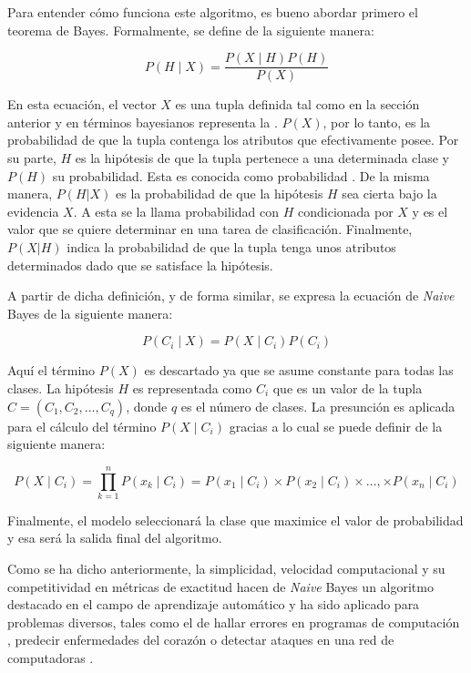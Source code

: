 Para entender cómo funciona este algoritmo, es bueno abordar primero  el teorema
de Bayes. Formalmente, se define de la siguiente manera:

\begin{equation}
   P(H \mid X) = \frac{P(X \mid H) P(H)}{P(X)}
\end{equation}

En esta ecuación, el vector $X$ es una tupla definida tal como en la sección
anterior y en términos bayesianos representa la . $P(X)$,
por lo tanto, es la probabilidad de que la tupla contenga los atributos que
efectivamente posee. Por su parte, $H$ es la hipótesis de que la tupla pertenece
a una determinada clase y $P(H)$ su probabilidad. Esta es conocida como
probabilidad . De la misma manera, $P(H|X)$ es la
probabilidad de que la hipótesis $H$ sea cierta bajo la evidencia $X$. A esta se
la llama probabilidad  con $H$ condicionada por $X$ y es
el valor que se quiere determinar en una tarea de clasificación.  Finalmente,
$P(X|H)$ indica la probabilidad de que la tupla tenga unos atributos
determinados dado que se satisface la hipótesis.

A partir de dicha definición, y de forma similar, se expresa la ecuación de
\textit{Naive} Bayes de la siguiente manera:

\begin{equation} 
   P(C_{i} \mid X) = P(X \mid C_{i}) P(C_{i})
\end{equation}

Aquí el término $P(X)$ es descartado ya que se asume constante para todas las
clases. La hipótesis $H$ es representada como $C_{i}$ que es un valor de la
tupla $C=(C_{1},C_{2},\dots,C_{q})$, donde $q$ es el número de clases. La
presunción  es aplicada para el cálculo del término $P(X \mid
C_{i})$ gracias a lo cual se puede definir de la siguiente manera:

\begin{equation} 
   P(X \mid C_{i}) = \prod\limits_{k=1}^n{P(x_{k} \mid C_{i})} =
   P(x_{1} \mid C_{i}) \times 
   P(x_{2} \mid C_{i}) \times \dots, \times 
   P(x_{n} \mid C_{i})   
\end{equation}

Finalmente, el modelo seleccionará la clase que maximice el valor de
probabilidad y esa será la salida final del algoritmo.  

Como se ha dicho anteriormente, la simplicidad, velocidad computacional y su
competitividad en métricas de exactitud hacen de \textit{Naive} Bayes un
algoritmo destacado en el campo de aprendizaje automático
\cite{wickramasinghe_naive_2020} y ha sido aplicado para problemas diversos,
tales como el de hallar errores en programas de computación
\cite{arar_feature_2017}, predecir enfermedades del corazón
\cite{dulhare_prediction_2018} o detectar ataques en una red de computadoras
\cite{kalutarage_detecting_2015}.


